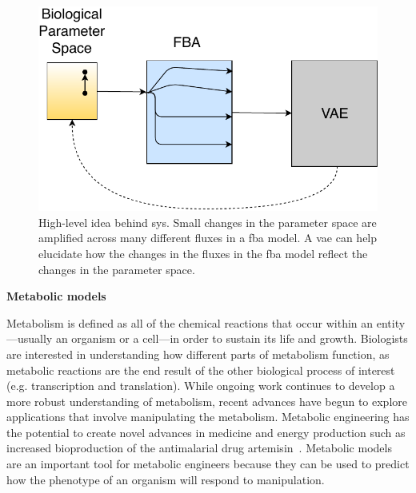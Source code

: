 \begin{figure}[t!]
\begin{center}
\includegraphics[width=\textwidth]{figs/FBA_Amplifier.pdf}
\end{center}
\caption[High-level idea behind \gls{sys}]{High-level idea behind \gls{sys}.
Small changes in the parameter space are amplified across many different fluxes in a \gls{fba} model.
A \gls{vae} can help elucidate how the changes in the fluxes in the \gls{fba} model reflect the changes in the parameter space. 
}
\label{fig:fba_amp}
\end{figure}

\textbf{Metabolic models}

Metabolism is defined as all of the chemical reactions that occur within an entity---usually an organism or a cell---in order to sustain its life and growth.
Biologists are interested in understanding how different parts of metabolism function, as metabolic reactions are the end result of the other biological process of interest (e.g. transcription and translation).
While ongoing work continues to develop a more robust understanding of metabolism, recent advances have begun to explore applications that involve manipulating the metabolism. 
Metabolic engineering has the potential to create novel advances in medicine and energy production such as increased bioproduction of the antimalarial drug artemisin~\cite{keasling2012synthetic}.
Metabolic models are an important tool for metabolic engineers because they can be used to predict how the phenotype of an organism will respond to manipulation.

